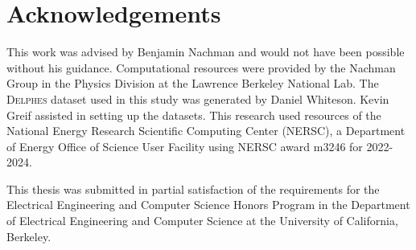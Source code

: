 \section{Acknowledgements}

This work was advised by Benjamin Nachman and would not have been possible without his guidance. Computational resources were provided by the Nachman Group in the Physics Division at the Lawrence Berkeley National Lab. The \textsc{Delphes} dataset used in this study was generated by Daniel Whiteson. Kevin Greif assisted in setting up the datasets. This research used resources of the National Energy Research Scientific Computing Center (NERSC), a Department of Energy Office of Science User Facility using NERSC award m3246 for 2022-2024.

This thesis was submitted in partial satisfaction of the requirements for the Electrical Engineering and Computer Science Honors Program in the Department of Electrical Engineering and Computer Science at the University of California, Berkeley.
